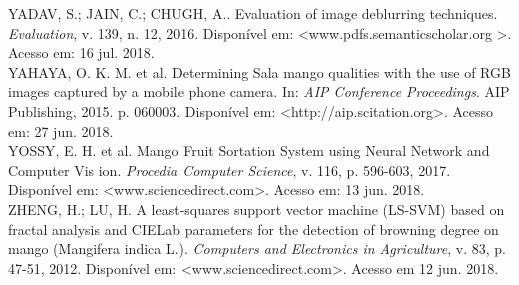 \noindent YADAV, S.; JAIN, C.; CHUGH, A.. Evaluation of image deblurring techniques. \textit{Evaluation}, v. 139, n. 12, 2016. Disponível em: <www.pdfs.semanticscholar.org >. Acesso em: 16 jul. 2018.
\\

\noindent YAHAYA, O. K. M. et al. Determining Sala mango qualities with the use of RGB images captured by a mobile phone camera. In: \textit{AIP Conference Proceedings}. AIP Publishing, 2015. p. 060003. Disponível em: <http://aip.scitation.org>. Acesso em: 27 jun. 2018.
\\

\noindent YOSSY, E. H. et al. Mango Fruit Sortation System using Neural Network and Computer Vis
ion. \textit{Procedia Computer Science}, v. 116, p. 596-603, 2017. Disponível em: <www.sciencedirect.com>. Acesso em: 13 jun. 2018.
\\

\noindent ZHENG, H.; LU, H. A least-squares support vector machine (LS-SVM) based on fractal analysis and CIELab parameters for the detection of browning degree on mango (Mangifera indica L.). \textit{Computers and Electronics in Agriculture}, v. 83, p. 47-51, 2012. Disponível em: <www.sciencedirect.com>. Acesso em 12 jun. 2018.